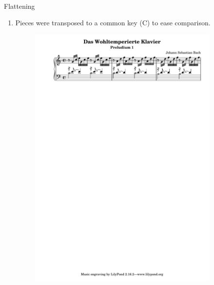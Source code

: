 \documentclass[final]{beamer}
\newlength{\sepwid}
\newlength{\onecolwid}
\newlength{\onecolwidtwo}
\newlength{\halfcolwid}
\newlength{\halfcolwidtwo}
\begin{document}
\begin{frame}[t]
\begin{columns}[t]
\begin{column}{\onecolwid}
\end{column} %

\begin{column}{\sepwid}\end{column} %

\begin{column}{\onecolwidtwo} %
\begin{columns}[t]

\begin{column}{\halfcolwidtwo}

\begin{block}{Flattening}
\begin{enumerate}
\item{Pieces were transposed to a common key (C) to ease comparison.}
\begin{figure}
\includegraphics[width=1\halfcolwidtwo]{Visuals/WTK10.pdf}

\end{figure}
\end{enumerate}
\end{block}
\end{column}
\end{columns}
\end{column}
\end{columns}
\end{frame}
\end{document}
